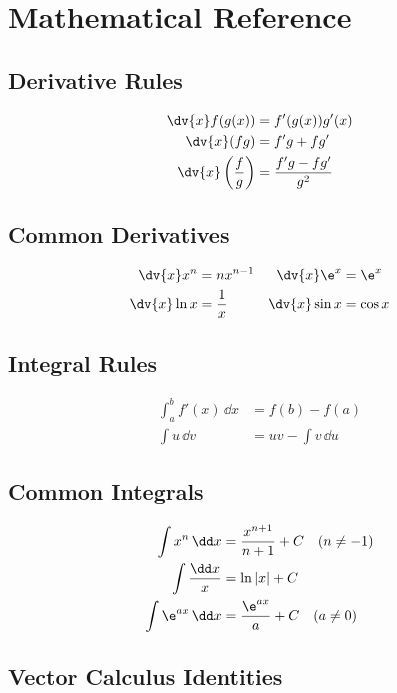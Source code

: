 \chapter{Mathematical Reference}

\section{Derivative Rules}
\begin{align}
\dv{x} f(g(x)) &= f'(g(x))g'(x) \\
\dv{x}(fg) &= f'g+fg' \\
\dv{x}\left(\frac fg\right) &= \frac{f'g-fg'}{g^2}
\end{align}

\section{Common Derivatives}
\begin{align}
\dv{x}x^n &= nx^{n-1} & \dv{x}\e^x &= \e^x \\
\dv{x}\ln x &= \frac1x & \dv{x}\sin x &= \cos x
\end{align}

\section{Integral Rules}
\begin{align}
\int_a^b f'(x)\,\dd x &= f(b)-f(a) \\
\int u\,\dd v &= uv-\int v\,\dd u
\end{align}

\section{Common Integrals}
\begin{align}
\int x^n\,\dd x &= \frac{x^{n+1}}{n+1}+C \quad(n\neq-1)\\
\int \frac{\dd x}{x} &= \ln|x|+C\\
\int \e^{ax}\,\dd x &= \frac{\e^{ax}}a+C\quad(a\neq0)
\end{align}

\section{Vector Calculus Identities}
\TODO
